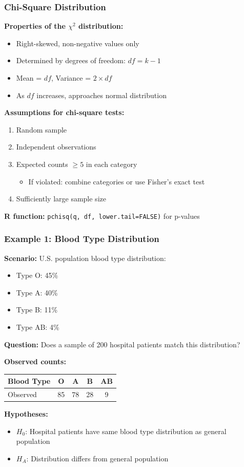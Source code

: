 \documentclass{beamer}
\begin{document}
\begin{frame}
\frametitle{Chi-Square Distribution}
\textbf{Properties of the $\chi^2$ distribution:}
\begin{itemize}
\item Right-skewed, non-negative values only
\item Determined by degrees of freedom: $df = k - 1$
\item Mean = $df$, Variance = $2 \times df$
\item As $df$ increases, approaches normal distribution
\end{itemize}

\vspace{0.5cm}
\textbf{Assumptions for chi-square tests:}
\begin{enumerate}
\item Random sample
\item Independent observations
\item Expected counts $\geq 5$ in each category
  \begin{itemize}
  \item If violated: combine categories or use Fisher's exact test
  \end{itemize}
\item Sufficiently large sample size
\end{enumerate}

\vspace{0.5cm}
\textbf{R function:} \texttt{pchisq(q, df, lower.tail=FALSE)} for p-values
\end{frame}

\begin{frame}
\frametitle{Example 1: Blood Type Distribution}
\textbf{Scenario:} U.S. population blood type distribution:
\begin{itemize}
\item Type O: 45\%
\item Type A: 40\%
\item Type B: 11\%
\item Type AB: 4\%
\end{itemize}

\vspace{0.3cm}
\textbf{Question:} Does a sample of 200 hospital patients match this distribution?

\vspace{0.3cm}
\textbf{Observed counts:}
\begin{center}
\begin{tabular}{lcccc}
\toprule
Blood Type & O & A & B & AB \\
\midrule
Observed & 85 & 78 & 28 & 9 \\
\bottomrule
\end{tabular}
\end{center}

\vspace{0.3cm}
\textbf{Hypotheses:}
\begin{itemize}
\item $H_0$: Hospital patients have same blood type distribution as general population
\item $H_A$: Distribution differs from general population
\end{itemize}
\end{frame}
\end{document}

